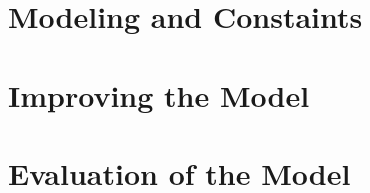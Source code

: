 \documentclass[a4paper]{article}
\begin{document}
\section{Modeling and Constaints}





\section{Improving the Model}



\section{Evaluation of the Model}




%
\end{document}
